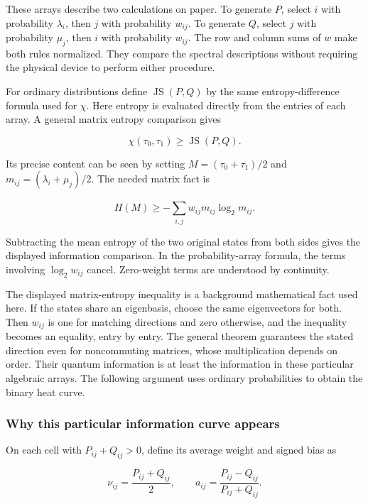 \documentclass[11pt,letterpaper]{article}
\begin{document}
These arrays describe two calculations on paper. To generate \(P\), select \(i\) with probability \(\lambda_{i}\), then \(j\) with probability \(w_{ij}\). To generate \(Q\), select \(j\) with probability \(\mu_{j}\), then \(i\) with probability \(w_{ij}\). The row and column sums of \(w\) make both rules normalized. They compare the spectral descriptions without requiring the physical device to perform either procedure.

For ordinary distributions define \(\operatorname{JS}(P,Q)\) by the same entropy-difference formula used for \(\chi\). Here entropy is evaluated directly from the entries of each array. A general matrix entropy comparison gives

\[\chi\left( \tau_{0},\tau_{1} \right) \geq \operatorname{JS}(P,Q).\]

Its precise content can be seen by setting \(M = \left( \tau_{0} + \tau_{1} \right)/2\) and \(m_{ij} = \left( \lambda_{i} + \mu_{j} \right)/2\). The needed matrix fact is

\[H(M) \geq - \sum_{i,j}^{}w_{ij}m_{ij}\log_{2}m_{ij}.\]

Subtracting the mean entropy of the two original states from both sides gives the displayed information comparison. In the probability-array formula, the terms involving \(\log_{2}w_{ij}\) cancel. Zero-weight terms are understood by continuity.

The displayed matrix-entropy inequality is a background mathematical fact used here. If the states share an eigenbasis, choose the same eigenvectors for both. Then \(w_{ij}\) is one for matching directions and zero otherwise, and the inequality becomes an equality, entry by entry. The general theorem guarantees the stated direction even for noncommuting matrices, whose multiplication depends on order. Their quantum information is at least the information in these particular algebraic arrays. The following argument uses ordinary probabilities to obtain the binary heat curve.

\subsubsection{Why this particular information curve appears}\label{why-this-particular-information-curve-appears}

On each cell with \(P_{ij} + Q_{ij} > 0\), define its average weight and signed bias as

\[\nu_{ij} = \frac{P_{ij} + Q_{ij}}{2},\quad\quad a_{ij} = \frac{P_{ij} - Q_{ij}}{P_{ij} + Q_{ij}}.\]
\end{document}
